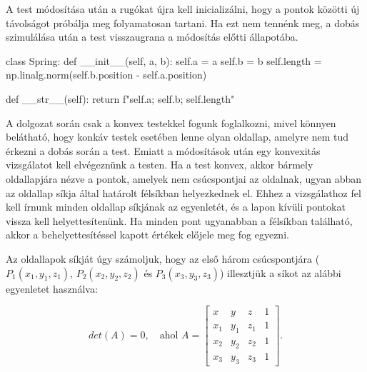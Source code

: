 A test módosítása után a rugókat újra kell inicializálni, hogy a pontok közötti új távolságot próbálja meg folyamatosan tartani.
Ha ezt nem tennénk meg, a dobás szimulálása után a test visszaugrana a módosítás előtti állapotába.

\begin{python}
class Spring:
    def __init__(self, a, b):
        self.a = a
        self.b = b
        self.length = np.linalg.norm(self.b.position - self.a.position)
	
    def __str__(self):
        return f"{self.a}; {self.b}; {self.length}"
\end{python}


A dolgozat során csak a konvex testekkel fogunk foglalkozni, mivel könnyen belátható, hogy konkáv testek esetében lenne olyan oldallap, amelyre nem tud érkezni a dobás során a test.
Emiatt a módosítások után egy konvexitás vizsgálatot kell elvégeznünk a testen.
Ha a test konvex, akkor bármely oldallapjára nézve a pontok, amelyek nem csúcspontjai az oldalnak, ugyan abban az oldallap síkja által határolt félsíkban helyezkednek el.
Ehhez a vizsgálathoz fel kell írnunk minden oldallap síkjának az egyenletét, és a lapon kívüli pontokat vissza kell helyettesítenünk.
Ha minden pont ugyanabban a félsíkban található, akkor a behelyettesítéssel kapott értékek előjele meg fog egyezni.

Az oldallapok síkját úgy számoljuk, hogy az első három csúcspontjára ($P_1(x_1, y_1, z_1)$, $P_2(x_2, y_2, z_2)$ és $P_3(x_3, y_3, z_3)$) illesztjük a síkot az alábbi egyenletet használva:

\[
det(A)=0,\quad \text{ahol } A = 
\begin{bmatrix}
	x & y & z & 1 \\
	x_1 & y_1 & z_1 & 1 \\
	x_2 & y_2 & z_2 & 1 \\
	x_3 & y_3 & z_3 & 1
\end{bmatrix}.
\]

